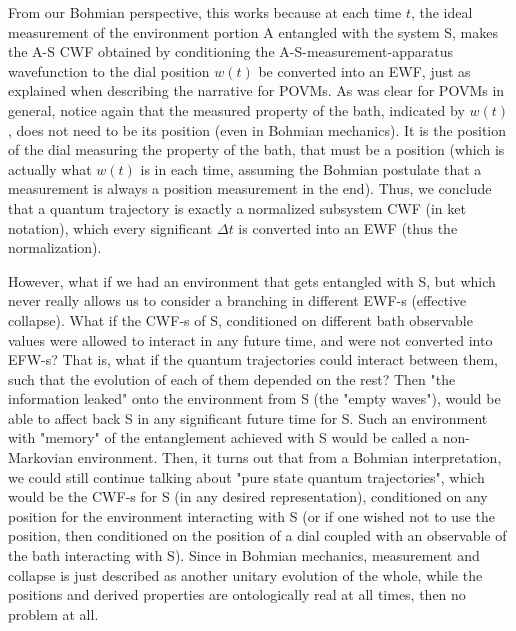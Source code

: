 \documentclass[11pt, a4paper]{article} %
\begin{document}
From our Bohmian perspective, this works because at each time $t$, the ideal measurement of the environment portion A entangled with the system S, makes the A-S CWF obtained by conditioning the A-S-measurement-apparatus wavefunction to the dial position $w(t)$ be converted into an EWF, just as explained when describing the narrative for POVMs. As was clear for POVMs in general, notice again that the measured property of the bath, indicated by $w(t)$, does not need to be its position (even in Bohmian mechanics). It is the position of the dial measuring the property of the bath, that must be a position (which is actually what $w(t)$ is in each time, assuming the Bohmian postulate that a measurement is always a position measurement in the end). Thus, we conclude that a quantum trajectory is exactly a normalized subsystem CWF (in ket notation), which every significant $\Delta t$ is converted into an EWF (thus the normalization).

However, what if we had an environment that gets entangled with S, but which never really allows us to consider a branching in different EWF-s (effective collapse). What if the CWF-s of S, conditioned on different bath observable values were allowed to interact in any future time, and were not converted into EFW-s? That is, what if the quantum trajectories could interact between them, such that the evolution of each of them depended on the rest? Then "the information leaked" onto the environment from S (the "empty waves"), would be able to affect back S in any significant future time for S. Such an environment with "memory" of the entanglement achieved with S would be called a non-Markovian environment. Then, it turns out that from a Bohmian interpretation, we could still continue talking about "pure state quantum trajectories", which would be the CWF-s for S (in any desired representation), conditioned on any position for the environment interacting with S (or if one wished not to use the position, then conditioned on the position of a dial coupled with an observable of the bath interacting with S). Since in Bohmian mechanics, measurement and collapse is just described as another unitary evolution of the whole, while the positions and derived properties are ontologically real at all times, then no problem at all.
\end{document}
